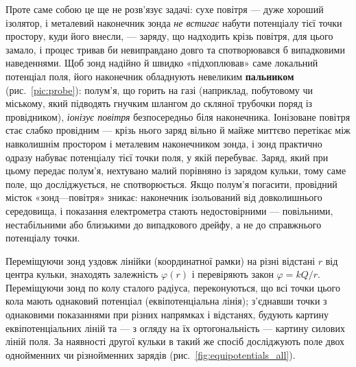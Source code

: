 Проте саме собою це ще не розв'язує задачі: сухе повітря --- дуже хороший ізолятор, і металевий наконечник зонда \emph{не встигає} набути потенціалу тієї точки простору, куди його внесли, --- заряду, що надходить крізь повітря, для цього замало, і процес тривав би невиправдано довго та спотворювався б випадковими наведеннями. Щоб зонд надійно й швидко «підхоплював» саме локальний потенціал поля, його наконечник обладнують невеликим \textbf{пальником} (рис.~\ref{pic:probe}): полум'я, що горить на газі (наприклад, побутовому чи міському, який підводять гнучким шлангом до скляної трубочки поряд із провідником), \emph{іонізує повітря} безпосередньо біля наконечника. Іонізоване повітря стає слабко провідним --- крізь нього заряд вільно й майже миттєво перетікає між навколишнім простором і металевим наконечником зонда, і зонд практично одразу набуває потенціалу тієї точки поля, у якій перебуває. Заряд, який при цьому передає полум'я, нехтувано малий порівняно із зарядом кульки, тому саме поле, що досліджується, не спотворюється. Якщо полум'я погасити, провідний місток «зонд—повітря» зникає: наконечник ізольований від довколишнього середовища, і показання електрометра стають недостовірними --- повільними, нестабільними або близькими до випадкового дрейфу, а не до справжнього потенціалу точки.

Переміщуючи зонд уздовж лінійки (координатної рамки) на різні відстані $r$ від центра кульки, знаходять залежність $\varphi(r)$ і перевіряють закон $\varphi = kQ/r$. Переміщуючи зонд по колу сталого радіуса, переконуються, що всі точки цього кола мають однаковий потенціал (еквіпотенціальна лінія); з'єднавши точки з однаковими показаннями при різних напрямках і відстанях, будують картину еквіпотенціальних ліній та --- з огляду на їх ортогональність --- картину силових ліній поля. За наявності другої кульки в такий же спосіб досліджують поле двох однойменних чи різнойменних зарядів (рис.~\ref{fig:equipotentials_all}).

